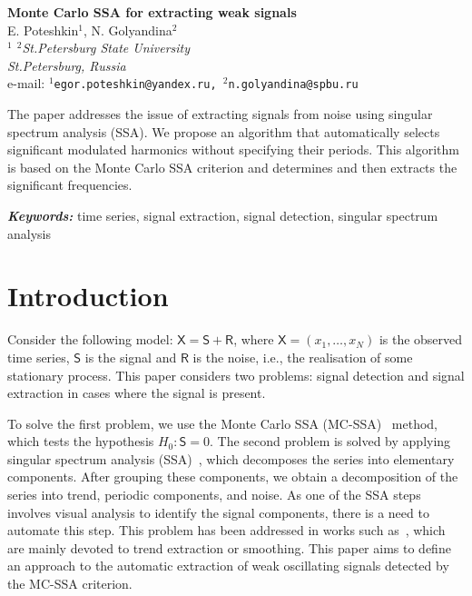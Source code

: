 \documentclass[12pt]{article}
\providecommand{\keywords}[1]
{
\vspace{2mm}\hspace{20pt}\textbf{\textit{Keywords:}} #1
}
\providecommand{\abskeyw}[2]
{
\begin{small}
\begin{adjustwidth}{10mm}{10mm}
\vspace{1mm}\hspace{20pt}#1

\keywords{#2}
\end{adjustwidth}
\end{small}
}
\begin{document}
\begin{center}
{\Large\bf Monte Carlo SSA for extracting weak signals}\\\vspace{2mm} {\sc E. Poteshkin$^1$, N. Golyandina$^2$}\\\vspace{2mm}
{\it $^{1}$ $^{2}$St.Petersburg State University\\
St.Petersburg, Russia\\} e-mail: {\tt $^1$egor.poteshkin@yandex.ru,
$^2$n.golyandina@spbu.ru}

\abskeyw{The paper addresses the issue of extracting signals from noise using singular spectrum analysis (SSA). We propose an algorithm that automatically selects significant modulated harmonics without specifying their periods. This algorithm is based on the Monte Carlo SSA criterion and determines and then extracts the significant frequencies.}{time series, signal extraction, signal detection, singular spectrum analysis}
\end{center}

\section{Introduction}

Consider the following model: $\mathsf{X}=\mathsf{S}+\mathsf{R}$, where $\mathsf{X} = (x_1,\ldots,x_N)$ is the observed time series, $\mathsf{S}$ is the signal and $\mathsf{R}$ is the noise, i.e., the realisation of some stationary process.  This paper considers two problems: signal detection and signal extraction in cases where the signal is present.

To solve the first problem, we use the Monte Carlo SSA (MC-SSA)~\cite{AllenSmith96} method, which tests the hypothesis $H_0:\mathsf{S}=0$. The second problem is solved by applying singular spectrum analysis (SSA)~\cite{Broomhead1986, ssa2001}, which decomposes the series into elementary components. After grouping these components, we obtain a decomposition of the series into trend, periodic components, and noise.   As one of the SSA steps involves visual analysis to identify the signal components, there is a need to automate this step. This problem has been addressed in works such as~\cite{alexandrov, Kalantari2019, circSSA, autoSSA}, which are mainly devoted to trend extraction or smoothing. This paper aims to define an approach to the automatic extraction of weak oscillating signals detected by the MC-SSA criterion.
\end{document}
